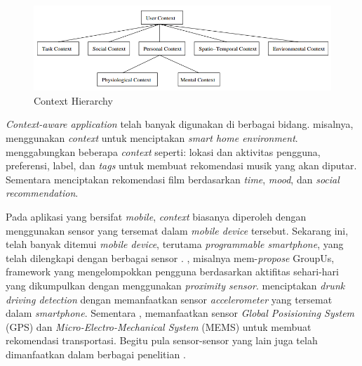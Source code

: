 \begin{figure}[!]
    \centering
    \includegraphics[width=\textwidth]{../../Resources/Images/context}
    \caption{Context Hierarchy \citep{kofod-petersen_case-based_2003}}
    \label{fig:capi-ilustration}
\end{figure}


\textit{Context-aware application} telah banyak digunakan di berbagai bidang. \citep{tsai_context-aware_2016} misalnya, menggunakan \textit{context} untuk menciptakan \textit{smart home environment}. \citep{magara_mplist:_2016} menggabungkan beberapa \textit{context} seperti: lokasi dan aktivitas pengguna, preferensi, label, dan \textit{tags} untuk membuat rekomendasi musik yang akan diputar. Sementara \citep{said_introduction_2013} menciptakan rekomendasi film berdasarkan \textit{time}, \textit{mood}, dan \textit{social recommendation}.


Pada aplikasi yang bersifat \textit{mobile}, \textit{context} biasanya diperoleh dengan menggunakan sensor yang tersemat dalam \textit{mobile device} tersebut. Sekarang ini, telah banyak ditemui \textit{mobile device}, terutama \textit{programmable smartphone}, yang telah dilengkapi dengan berbagai sensor \citep{cao_mobile_2015}. \citep{do_groupus:_2011}, misalnya mem-\textit{propose} GroupUs, framework yang mengelompokkan pengguna berdasarkan aktifitas sehari-hari yang dikumpulkan dengan menggunakan \textit{proximity sensor}. \citep{dai_mobile_2010} menciptakan \textit{drunk driving detection} dengan memanfaatkan sensor \textit{accelerometer} yang tersemat dalam \textit{smartphone}. Sementara \citep{zou_context-aware_2016}, memanfaatkan sensor \textit{Global Posisioning System} (GPS) dan \textit{Micro-Electro-Mechanical System} (MEMS) untuk membuat rekomendasi transportasi. Begitu pula sensor-sensor yang lain juga telah dimanfaatkan dalam berbagai penelitian \citep{dai_perfalld:_2010, lu_soundsense:_2009, bao_movi:_2010, rubel_toward_2005, atzmueller_towards_2013}.


